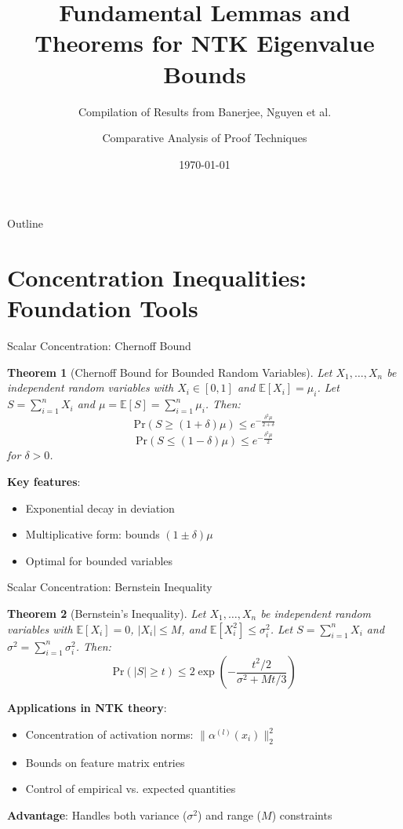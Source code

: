 \documentclass{beamer}
\title{Fundamental Lemmas and Theorems for NTK Eigenvalue Bounds}
\subtitle{Compilation of Results from Banerjee, Nguyen et al.}
\author{Comparative Analysis of Proof Techniques}
\date{\today}
\newtheorem{theorem}{Theorem}[section]
\newcommand{\E}{\mathbb{E}}
\newcommand{\Pr}{\text{Pr}}
\begin{document}
\begin{frame}
  \titlepage
\end{frame}

\begin{frame}{Outline}
  \tableofcontents
\end{frame}

\section{Concentration Inequalities: Foundation Tools}

\begin{frame}{Scalar Concentration: Chernoff Bound}
  \begin{theorem}[Chernoff Bound for Bounded Random Variables]
  Let $X_1, \ldots, X_n$ be independent random variables with $X_i \in [0,1]$ and $\E[X_i] = \mu_i$. Let $S = \sum_{i=1}^n X_i$ and $\mu = \E[S] = \sum_{i=1}^n \mu_i$. Then:
  $$\Pr(S \geq (1+\delta)\mu) \leq e^{-\frac{\delta^2 \mu}{2+\delta}}$$
  $$\Pr(S \leq (1-\delta)\mu) \leq e^{-\frac{\delta^2 \mu}{2}}$$
  for $\delta > 0$.
  \end{theorem}
  
  \textbf{Key features}:
  \begin{itemize}
    \item Exponential decay in deviation
    \item Multiplicative form: bounds $(1 \pm \delta)\mu$
    \item Optimal for bounded variables
  \end{itemize}
\end{frame}

\begin{frame}{Scalar Concentration: Bernstein Inequality}
  \begin{theorem}[Bernstein's Inequality]
  Let $X_1, \ldots, X_n$ be independent random variables with $\E[X_i] = 0$, $|X_i| \leq M$, and $\E[X_i^2] \leq \sigma_i^2$. Let $S = \sum_{i=1}^n X_i$ and $\sigma^2 = \sum_{i=1}^n \sigma_i^2$. Then:
  $$\Pr(|S| \geq t) \leq 2\exp\left(-\frac{t^2/2}{\sigma^2 + Mt/3}\right)$$
  \end{theorem}
  
  \textbf{Applications in NTK theory}:
  \begin{itemize}
    \item Concentration of activation norms: $\|\alpha^{(l)}(x_i)\|_2^2$
    \item Bounds on feature matrix entries
    \item Control of empirical vs. expected quantities
  \end{itemize}
  
  \textbf{Advantage}: Handles both variance ($\sigma^2$) and range ($M$) constraints
\end{frame}
\end{document}
